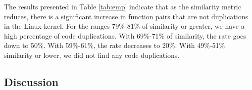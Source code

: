 

The results presented in Table \ref{tab:emp} indicate that as the similarity metric reduces, 
there is a significant increase in function pairs that are not duplications in the Linux kernel. 
For the ranges 79\%-81\% of similarity or greater, we have a high percentage of code duplications. 
With 69\%-71\% of similarity, the rate goes down to 50\%. With 59\%-61\%, the rate decreases to 20\%.
With 49\%-51\% similarity or lower, we did not find any code duplications.

\subsection{Discussion}
